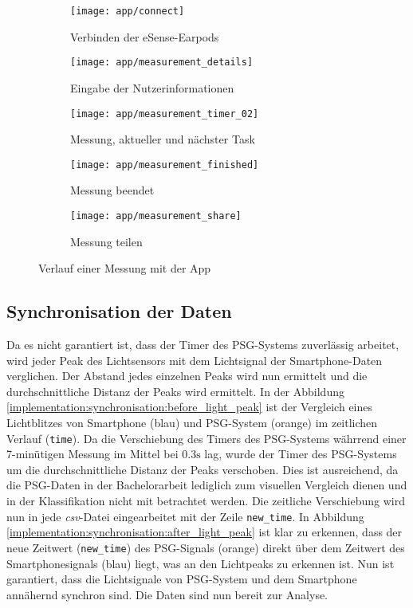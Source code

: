 \begin{figure}[ht]
  \centering
  \begin{subfigure}{.25\textwidth}
    \texttt{[image: app/connect]}
    \caption{Verbinden der eSense-Earpods}
    \label{implementation:app:screenshots:connect_bluetooth}
  \end{subfigure}
  \begin{subfigure}{.25\textwidth}
    \texttt{[image: app/measurement\_details]}
    \caption{Eingabe der Nutzerinformationen}
    \label{implementation:app:screenshots:user_studies_information}
  \end{subfigure}
  \begin{subfigure}{.25\textwidth}
    \texttt{[image: app/measurement\_timer\_02]}
    \caption{Messung, aktueller und nächster Task}
    \label{implementation:app:screenshots:measurement_started}
  \end{subfigure}
  \begin{subfigure}{.25\textwidth}
    \texttt{[image: app/measurement\_finished]}
    \caption{Messung beendet}
    \label{implementation:app:screenshots:sampling_stopped}
  \end{subfigure}
  \begin{subfigure}{.25\textwidth}
    \texttt{[image: app/measurement\_share]}
    \caption{Messung teilen}
    \label{implementation:app:screenshots:share}
  \end{subfigure}
  \caption{Verlauf einer Messung mit der App}
  \label{implementation:app:screenshots}
\end{figure}

\subsection{Synchronisation der Daten}
\label{ch:Implementierung:data_sync}
Da es nicht garantiert ist, dass der Timer des PSG-Systems zuverlässig arbeitet, wird jeder Peak des Lichtsensors mit dem Lichtsignal der Smartphone-Daten verglichen.
Der Abstand jedes einzelnen Peaks wird nun ermittelt und die durchschnittliche Distanz der Peaks wird ermittelt.
In der Abbildung \ref{implementation:synchronisation:before_light_peak} ist der Vergleich eines Lichtblitzes von Smartphone (blau) und PSG-System (orange) im zeitlichen Verlauf (\texttt{time}).
Da die Verschiebung des Timers des PSG-Systems währrend einer 7-minütigen Messung im Mittel bei $0.3\si{\s}$ lag, wurde der Timer des PSG-Systems um die durchschnittliche Distanz der Peaks verschoben.
Dies ist ausreichend, da die PSG-Daten in der Bachelorarbeit lediglich zum visuellen Vergleich dienen und in der Klassifikation nicht mit betrachtet werden. 
Die zeitliche Verschiebung wird nun in jede \textit{csv}-Datei eingearbeitet mit der Zeile \texttt{new\_time}.
In Abbildung \ref{implementation:synchronisation:after_light_peak} ist klar zu erkennen, dass der neue Zeitwert (\texttt{new\_time}) des PSG-Signals (orange) direkt über dem Zeitwert des Smartphonesignals (blau) liegt, was an den Lichtpeaks zu erkennen ist.
Nun ist garantiert, dass die Lichtsignale von PSG-System und dem Smartphone annähernd synchron sind. Die Daten sind nun bereit zur Analyse.

